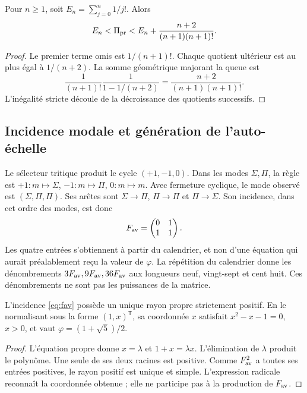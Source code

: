 \begin{proposition}
Pour \(n\ge1\), soit \(E_n=\sum_{j=0}^n1/j!\). Alors
\[
 E_n<\Pi_{\rm pr}<E_n+\frac{n+2}{(n+1)(n+1)!}.
\]
\end{proposition}
\begin{proof}
Le premier terme omis est \(1/(n+1)!\). Chaque quotient ultérieur est au plus égal à \(1/(n+2)\). La somme géométrique majorant la queue est
\[
 \frac1{(n+1)!}\frac1{1-1/(n+2)}
 =\frac{n+2}{(n+1)(n+1)!}.
\]
L'inégalité stricte découle de la décroissance des quotients successifs.
\end{proof}

\subsection{Incidence modale et génération de l'auto-échelle}

Le sélecteur tritique produit le cycle \((+1,-1,0)\). Dans les modes \(\Sigma,\Pi\), la règle est \(+1:m\mapsto\Sigma\), \(-1:m\mapsto\Pi\), \(0:m\mapsto m\). Avec fermeture cyclique, le mode observé est \((\Sigma,\Pi,\Pi)\). Ses arêtes sont \(\Sigma\to\Pi\), \(\Pi\to\Pi\) et \(\Pi\to\Sigma\). Son incidence, dans cet ordre des modes, est donc
\begin{equation}
 F_{\rm av}=\begin{pmatrix}0&1\\1&1\end{pmatrix}.
 \label{eq:fav}
\end{equation}
Les quatre entrées s'obtiennent à partir du calendrier, et non d'une équation qui aurait préalablement reçu la valeur de \(\varphi\). La répétition du calendrier donne les dénombrements \(3F_{\rm av},9F_{\rm av},36F_{\rm av}\) aux longueurs neuf, vingt-sept et cent huit. Ces dénombrements ne sont pas les puissances de la matrice.

\begin{theorem}
L'incidence \eqref{eq:fav} possède un unique rayon propre strictement positif. En le normalisant sous la forme \((1,x)^{\mathsf T}\), sa coordonnée \(x\) satisfait \(x^2-x-1=0\), \(x>0\), et vaut \(\varphi=(1+\sqrt5)/2\).
\end{theorem}
\begin{proof}
L'équation propre donne \(x=\lambda\) et \(1+x=\lambda x\). L'élimination de \(\lambda\) produit le polynôme. Une seule de ses deux racines est positive. Comme \(F_{\rm av}^2\) a toutes ses entrées positives, le rayon positif est unique et simple. L'expression radicale reconnaît la coordonnée obtenue ; elle ne participe pas à la production de \(F_{\rm av}\).
\end{proof}

